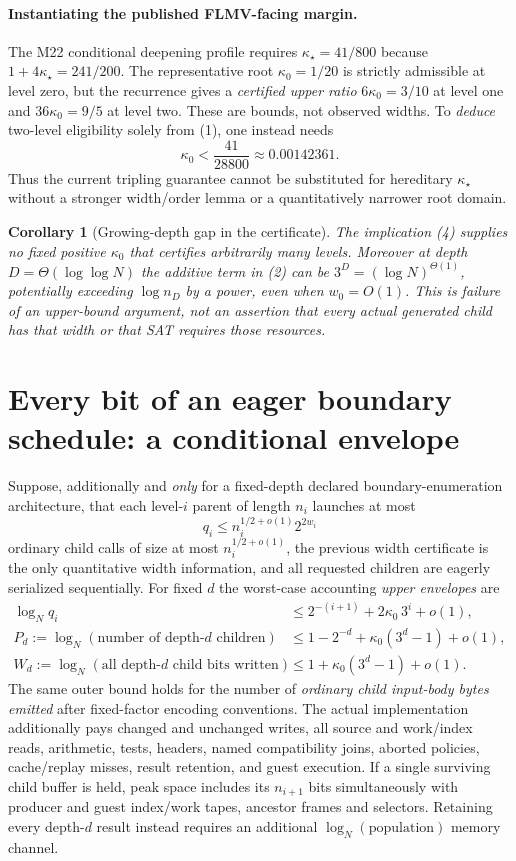\documentclass[11pt]{article}
\newtheorem{corollary}[theorem]{Corollary}
\begin{document}
\paragraph{Instantiating the published FLMV-facing margin.}
The M22 conditional deepening profile requires
$\kappa_\star=41/800$ because
$1+4\kappa_\star=241/200$.
The representative root $\kappa_0=1/20$ is
strictly admissible at level zero, but the recurrence gives
a \emph{certified upper ratio} $6\kappa_0=3/10$ at
level one and $36\kappa_0=9/5$ at level two.
These are bounds, not observed widths.  To \emph{deduce}
two-level eligibility solely from (1), one instead needs
\[
 \kappa_0<\frac{41}{28800}\approx0.00142361 .
\]
Thus the current tripling guarantee cannot be substituted
for hereditary $\kappa_\star$ without a stronger width/order
lemma or a quantitatively narrower root domain.

\begin{corollary}[Growing-depth gap in the certificate]\label{cor:depth}
The implication (4) supplies no \emph{fixed positive}
$\kappa_0$ that certifies arbitrarily many levels.
Moreover at depth $D=\Theta(\log\log N)$ the additive
term in (2) can be $3^D=(\log N)^{\Theta(1)}$,
potentially exceeding $\log n_D$ by a power,
even when $w_0=O(1)$.
This is failure of an \emph{upper-bound argument},
not an assertion that every actual generated child
has that width or that SAT requires those resources.
\end{corollary}

\section{Every bit of an eager boundary schedule: a conditional envelope}
Suppose, additionally and \emph{only} for a fixed-depth
declared boundary-enumeration architecture, that each
level-$i$ parent of length $n_i$ launches at most
\[
 q_i\le n_i^{1/2+o(1)}2^{2w_i}
\]
ordinary child calls of size at most $n_i^{1/2+o(1)}$,
the previous width certificate is the only quantitative
width information, and all requested children are
eagerly serialized sequentially.  For fixed $d$ the
worst-case accounting \emph{upper envelopes} are
\[
 \begin{split}
 \log_N q_i&\le 2^{-(i+1)}+2\kappa_0\,3^i+o(1),\\
 P_d:=\log_N(\text{number of depth-$d$ children})
 &\le 1-2^{-d}+\kappa_0(3^d-1)+o(1),\\
 W_d:=\log_N(\text{all depth-$d$ child bits written})
 &\le \boxed{1+\kappa_0(3^d-1)+o(1)} .
 \tag{5}
 \end{split}
\]
The same outer bound holds for the number of \emph{ordinary child
input-body bytes emitted} after fixed-factor encoding conventions.
The actual implementation additionally pays changed and unchanged
writes, all source and work/index reads, arithmetic, tests,
headers, named compatibility joins, aborted policies,
cache/replay misses, result retention, and guest execution.
If a single surviving child buffer is held, peak space
includes its $n_{i+1}$ bits simultaneously with producer
and guest index/work tapes, ancestor frames and selectors.
Retaining every depth-$d$ result instead requires an
additional $\log_N(\text{population})$ memory channel.
\end{document}
